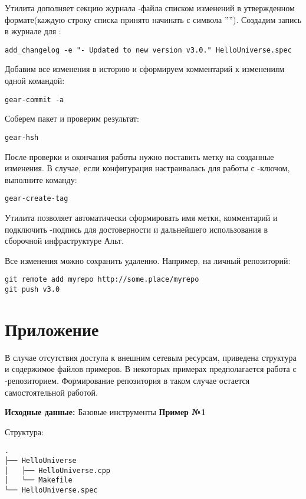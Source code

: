Утилита  дополняет секцию журнала -файла
списком изменений в утвержденном формате(каждую строку списка принято начинать
с символа ''\Sys{-}''). Создадим запись в журнале для :
\begin{verbatim}
add_changelog -e "- Updated to new version v3.0." HelloUniverse.spec
\end{verbatim}

Добавим все изменения в историю  и сформируем комментарий к изменениям
одной командой:
\begin{verbatim}
gear-commit -a
\end{verbatim}

Соберем пакет и проверим результат:
\begin{verbatim}
gear-hsh
\end{verbatim}

После проверки и окончания работы нужно поставить метку на созданные изменения.
В случае, если конфигурация  настраивалась для работы с -ключом,
выполните команду:
\begin{verbatim}
gear-create-tag
\end{verbatim}
Утилита  позволяет автоматически сформировать имя метки, комментарий
и подключить -подпись для достоверности и дальнейшего использования в
сборочной инфраструктуре Альт.

Все изменения можно сохранить удаленно. Например, на личный репозиторий:
\begin{verbatim}
git remote add myrepo http://some.place/myrepo
git push v3.0
\end{verbatim}

\section{Приложение}
В случае отсутствия доступа к внешним сетевым ресурсам, приведена структура
и содержимое файлов примеров. В некоторых примерах предполагается работа с
-репозиторием. Формирование репозитория в таком случае остается
самостоятельной работой.

\textbf{Исходные данные:} Базовые инструменты  \textbf{Пример №1}

Структура:
\begin{verbatim}
.
├── HelloUniverse
│   ├── HelloUniverse.cpp
│   └── Makefile
└── HelloUniverse.spec

\end{verbatim}

